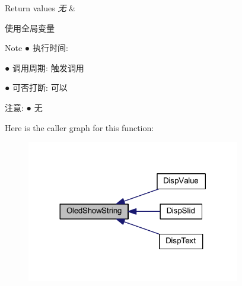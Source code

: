 \begin{DoxyRetVals}{\-Return values}
{\em 无} & \\
\hline
\end{DoxyRetVals}
\begin{DoxyParagraph}{使用全局变量 }

\end{DoxyParagraph}
\begin{DoxyNote}{\-Note}
● 执行时间\-: \par
 ● 调用周期\-: 触发调用 \par
 ● 可否打断\-: 可以 \par

\end{DoxyNote}
\begin{DoxyParagraph}{注意\-:}
● 无 \par
 
\end{DoxyParagraph}


\-Here is the caller graph for this function\-:\nopagebreak
\begin{figure}[H]
\begin{center}
\leavevmode
\includegraphics[width=264pt]{group___o_l_e_d_ga0e199e6945e270291c54aedda692d48c_icgraph}
\end{center}
\end{figure}


